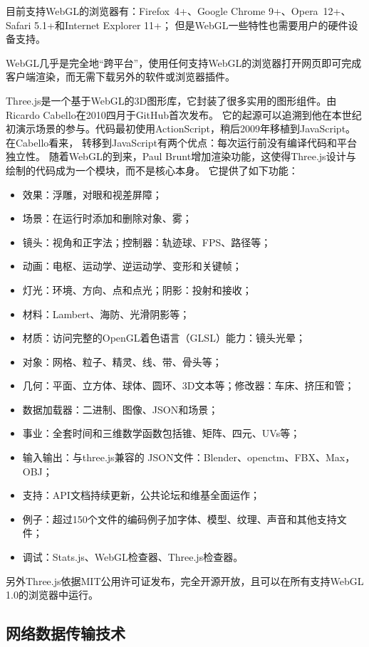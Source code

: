 目前支持WebGL的浏览器有：Firefox 4+、Google Chrome 9+、Opera 12+、Safari 5.1+和Internet Explorer 11+；
但是WebGL一些特性也需要用户的硬件设备支持。

WebGL几乎是完全地“跨平台”，使用任何支持WebGL的浏览器打开网页即可完成客户端渲染，而无需下载另外的软件或浏览器插件。

Three.js是一个基于WebGL的3D图形库，它封装了很多实用的图形组件。由Ricardo Cabello在2010四月于GitHub首次发布。
它的起源可以追溯到他在本世纪初演示场景的参与。代码最初使用ActionScript，稍后2009年移植到JavaScript。在Cabello看来，
转移到JavaScript有两个优点：每次运行前没有编译代码和平台独立性。
随着WebGL的到来，Paul Brunt增加渲染功能，这使得Three.js设计与绘制的代码成为一个模块，而不是核心本身。
它提供了如下功能：

\begin{itemize}
    \item 效果：浮雕，对眼和视差屏障；
    \item 场景：在运行时添加和删除对象、雾；
    \item 镜头：视角和正字法；控制器：轨迹球、FPS、路径等；
    \item 动画：电枢、运动学、逆运动学、变形和关键帧；
    \item 灯光：环境、方向、点和点光；阴影：投射和接收；
    \item 材料：Lambert、海防、光滑阴影等；
    \item 材质：访问完整的OpenGL着色语言（GLSL）能力：镜头光晕；
    \item 对象：网格、粒子、精灵、线、带、骨头等；
    \item 几何：平面、立方体、球体、圆环、3D文本等；修改器：车床、挤压和管；
    \item 数据加载器：二进制、图像、JSON和场景；
    \item 事业：全套时间和三维数学函数包括锥、矩阵、四元、UVs等；
    \item 输入输出：与three.js兼容的 JSON文件：Blender、openctm、FBX、Max，OBJ；
    \item 支持：API文档持续更新，公共论坛和维基全面运作；
    \item 例子：超过150个文件的编码例子加字体、模型、纹理、声音和其他支持文件；
    \item 调试：Stats.js、WebGL检查器、Three.js检查器。
\end{itemize}
另外Three.js依据MIT公用许可证发布，完全开源开放，且可以在所有支持WebGL 1.0的浏览器中运行。

\subsection{网络数据传输技术}

